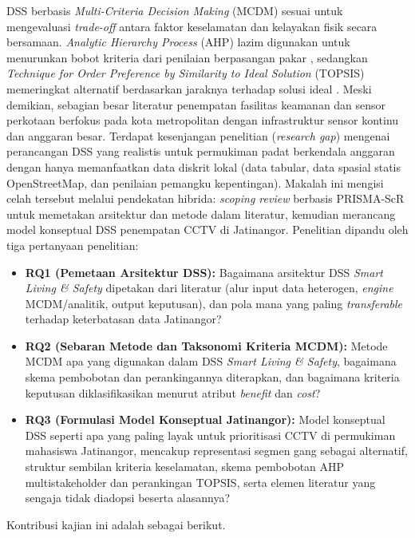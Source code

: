 \documentclass[10pt,twocolumn,a4paper]{article}
\begin{document}
DSS berbasis \textit{Multi-Criteria Decision Making} (MCDM) sesuai untuk mengevaluasi \textit{trade-off} antara faktor keselamatan dan kelayakan fisik secara bersamaan. \textit{Analytic Hierarchy Process} (AHP) lazim digunakan untuk menurunkan bobot kriteria dari penilaian berpasangan pakar \cite{saaty}, sedangkan \textit{Technique for Order Preference by Similarity to Ideal Solution} (TOPSIS) memeringkat alternatif berdasarkan jaraknya terhadap solusi ideal \cite{hwang}. Meski demikian, sebagian besar literatur penempatan fasilitas keamanan dan sensor perkotaan berfokus pada kota metropolitan dengan infrastruktur sensor kontinu dan anggaran besar. Terdapat kesenjangan penelitian (\textit{research gap}) mengenai perancangan DSS yang realistis untuk permukiman padat berkendala anggaran dengan hanya memanfaatkan data diskrit lokal (data tabular, data spasial statis OpenStreetMap, dan penilaian pemangku kepentingan). Makalah ini mengisi celah tersebut melalui pendekatan hibrida: \textit{scoping review} berbasis PRISMA-ScR untuk memetakan arsitektur dan metode dalam literatur, kemudian merancang model konseptual DSS penempatan CCTV di Jatinangor. Penelitian dipandu oleh tiga pertanyaan penelitian:
\begin{itemize}
\item \textbf{RQ1 (Pemetaan Arsitektur DSS):} Bagaimana arsitektur DSS \textit{Smart Living \& Safety} dipetakan dari literatur (alur input data heterogen, \textit{engine} MCDM/analitik, output keputusan), dan pola mana yang paling \textit{transferable} terhadap keterbatasan data Jatinangor?
\item \textbf{RQ2 (Sebaran Metode dan Taksonomi Kriteria MCDM):} Metode MCDM apa yang digunakan dalam DSS \textit{Smart Living \& Safety}, bagaimana skema pembobotan dan perankingannya diterapkan, dan bagaimana kriteria keputusan diklasifikasikan menurut atribut \textit{benefit} dan \textit{cost}?
\item \textbf{RQ3 (Formulasi Model Konseptual Jatinangor):} Model konseptual DSS seperti apa yang paling layak untuk prioritisasi CCTV di permukiman mahasiswa Jatinangor, mencakup representasi segmen gang sebagai alternatif, struktur sembilan kriteria keselamatan, skema pembobotan AHP multistakeholder dan perankingan TOPSIS, serta elemen literatur yang sengaja tidak diadopsi beserta alasannya?
\end{itemize}
Kontribusi kajian ini adalah sebagai berikut.
\end{document}
